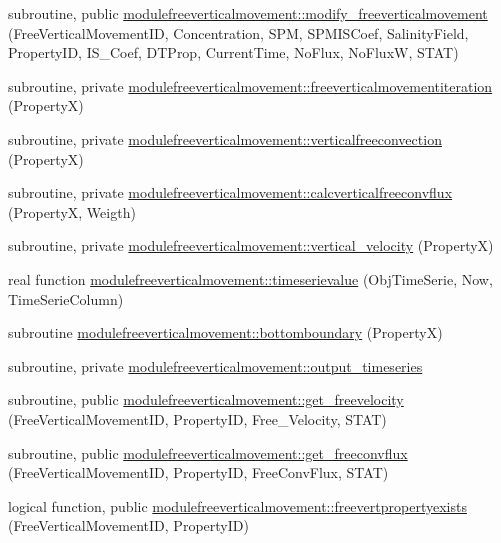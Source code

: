 \begin{DoxyCompactItemize}
subroutine, public \mbox{\hyperlink{namespacemodulefreeverticalmovement_a70493770ba7c42e3f3d4dc5f09ae0e45}{modulefreeverticalmovement\+::modify\+\_\+freeverticalmovement}} (Free\+Vertical\+Movement\+ID, Concentration, S\+PM, S\+P\+M\+I\+S\+Coef, Salinity\+Field, Property\+ID, I\+S\+\_\+\+Coef, D\+T\+Prop, Current\+Time, No\+Flux, No\+FluxW, S\+T\+AT)
\item 
subroutine, private \mbox{\hyperlink{namespacemodulefreeverticalmovement_ac736b639239aa370175df19fc8836c97}{modulefreeverticalmovement\+::freeverticalmovementiteration}} (PropertyX)
\item 
subroutine, private \mbox{\hyperlink{namespacemodulefreeverticalmovement_a31ae6c338b4621e00f2dd8c66bb9268f}{modulefreeverticalmovement\+::verticalfreeconvection}} (PropertyX)
\item 
subroutine, private \mbox{\hyperlink{namespacemodulefreeverticalmovement_a42b3411647c7bb8c92b023c61a0c49cc}{modulefreeverticalmovement\+::calcverticalfreeconvflux}} (PropertyX, Weigth)
\item 
subroutine, private \mbox{\hyperlink{namespacemodulefreeverticalmovement_ab6e298fcea3ea467957f90a97c8032df}{modulefreeverticalmovement\+::vertical\+\_\+velocity}} (PropertyX)
\item 
real function \mbox{\hyperlink{namespacemodulefreeverticalmovement_a543eec774fcc212b6cb45cb2eb05b988}{modulefreeverticalmovement\+::timeserievalue}} (Obj\+Time\+Serie, Now, Time\+Serie\+Column)
\item 
subroutine \mbox{\hyperlink{namespacemodulefreeverticalmovement_ad4e1681fa973f2a527c8fb380ad6fa31}{modulefreeverticalmovement\+::bottomboundary}} (PropertyX)
\item 
subroutine, private \mbox{\hyperlink{namespacemodulefreeverticalmovement_a074424b5e6d0b4d4588c869805dbf784}{modulefreeverticalmovement\+::output\+\_\+timeseries}}
\item 
subroutine, public \mbox{\hyperlink{namespacemodulefreeverticalmovement_ae1df1a4ce293addb56cc6c44759de660}{modulefreeverticalmovement\+::get\+\_\+freevelocity}} (Free\+Vertical\+Movement\+ID, Property\+ID, Free\+\_\+\+Velocity, S\+T\+AT)
\item 
subroutine, public \mbox{\hyperlink{namespacemodulefreeverticalmovement_ae2c2c24a260e587fdae043cc60422788}{modulefreeverticalmovement\+::get\+\_\+freeconvflux}} (Free\+Vertical\+Movement\+ID, Property\+ID, Free\+Conv\+Flux, S\+T\+AT)
\item 
logical function, public \mbox{\hyperlink{namespacemodulefreeverticalmovement_abe59234b027e4daf4dad54daa42f5438}{modulefreeverticalmovement\+::freevertpropertyexists}} (Free\+Vertical\+Movement\+ID, Property\+ID)

\end{DoxyCompactItemize}
